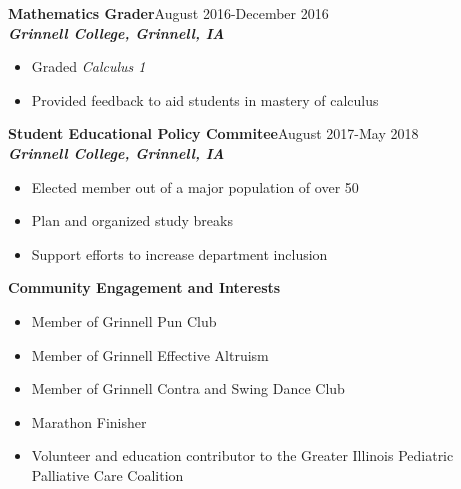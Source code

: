 \documentclass[9pt]{extarticle}
\begin{document}
\textbf{Mathematics Grader}\hfill August 2016-December 2016\\
\textbf{\textit{Grinnell College, Grinnell, IA}}
\begin{itemize}
\item Graded \textit{Calculus 1}
\item Provided feedback to aid students in mastery of calculus
\end{itemize}

\textbf{Student Educational Policy Commitee}\hfill August 2017-May 2018\\
\textbf{\textit{Grinnell College, Grinnell, IA}}
\begin{itemize}
\item Elected member out of a major population of over 50
\item Plan and organized study breaks
\item Support efforts to increase department inclusion
\end{itemize}


\begin{large}
\begin{center}\textbf{Community Engagement and Interests}
\end{center}
\end{large}
\begin{itemize}
\item Member of Grinnell Pun Club
\item Member of Grinnell Effective Altruism
\item Member of Grinnell Contra and Swing Dance Club
\item Marathon Finisher
\item Volunteer and education contributor to the Greater Illinois
  Pediatric Palliative Care Coalition
\end{itemize}
\end{document}

